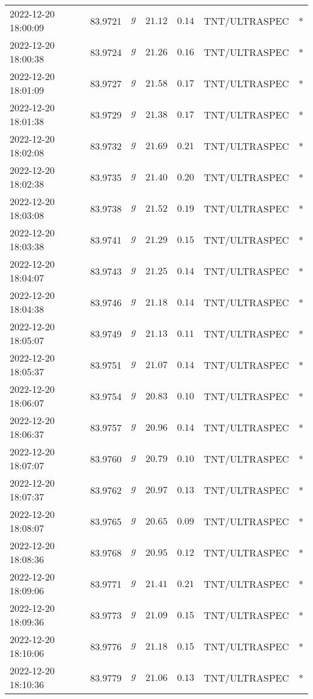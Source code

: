 \documentclass{nature_plusfigure}
\begin{document}
\begin{supplement}
\begin{center}
\begin{longtable}{lllllll}
2022-12-20 18:00:09 & 83.9721 & $g$ & $21.12$ & $0.14$ & TNT/ULTRASPEC & * \\ 
2022-12-20 18:00:38 & 83.9724 & $g$ & $21.26$ & $0.16$ & TNT/ULTRASPEC & * \\ 
2022-12-20 18:01:09 & 83.9727 & $g$ & $21.58$ & $0.17$ & TNT/ULTRASPEC & * \\ 
2022-12-20 18:01:38 & 83.9729 & $g$ & $21.38$ & $0.17$ & TNT/ULTRASPEC & * \\ 
2022-12-20 18:02:08 & 83.9732 & $g$ & $21.69$ & $0.21$ & TNT/ULTRASPEC & * \\ 
2022-12-20 18:02:38 & 83.9735 & $g$ & $21.40$ & $0.20$ & TNT/ULTRASPEC & * \\ 
2022-12-20 18:03:08 & 83.9738 & $g$ & $21.52$ & $0.19$ & TNT/ULTRASPEC & * \\ 
2022-12-20 18:03:38 & 83.9741 & $g$ & $21.29$ & $0.15$ & TNT/ULTRASPEC & * \\ 
2022-12-20 18:04:07 & 83.9743 & $g$ & $21.25$ & $0.14$ & TNT/ULTRASPEC & * \\ 
2022-12-20 18:04:38 & 83.9746 & $g$ & $21.18$ & $0.14$ & TNT/ULTRASPEC & * \\ 
2022-12-20 18:05:07 & 83.9749 & $g$ & $21.13$ & $0.11$ & TNT/ULTRASPEC & * \\ 
2022-12-20 18:05:37 & 83.9751 & $g$ & $21.07$ & $0.14$ & TNT/ULTRASPEC & * \\ 
2022-12-20 18:06:07 & 83.9754 & $g$ & $20.83$ & $0.10$ & TNT/ULTRASPEC & * \\ 
2022-12-20 18:06:37 & 83.9757 & $g$ & $20.96$ & $0.14$ & TNT/ULTRASPEC & * \\ 
2022-12-20 18:07:07 & 83.9760 & $g$ & $20.79$ & $0.10$ & TNT/ULTRASPEC & * \\ 
2022-12-20 18:07:37 & 83.9762 & $g$ & $20.97$ & $0.13$ & TNT/ULTRASPEC & * \\ 
2022-12-20 18:08:07 & 83.9765 & $g$ & $20.65$ & $0.09$ & TNT/ULTRASPEC & * \\ 
2022-12-20 18:08:36 & 83.9768 & $g$ & $20.95$ & $0.12$ & TNT/ULTRASPEC & * \\ 
2022-12-20 18:09:06 & 83.9771 & $g$ & $21.41$ & $0.21$ & TNT/ULTRASPEC & * \\ 
2022-12-20 18:09:36 & 83.9773 & $g$ & $21.09$ & $0.15$ & TNT/ULTRASPEC & * \\ 
2022-12-20 18:10:06 & 83.9776 & $g$ & $21.18$ & $0.15$ & TNT/ULTRASPEC & * \\ 
2022-12-20 18:10:36 & 83.9779 & $g$ & $21.06$ & $0.13$ & TNT/ULTRASPEC & * \\ 

\end{longtable}
\end{center}
\end{supplement}
\end{document}
